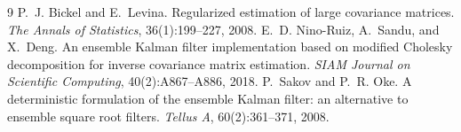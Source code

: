 \documentclass[11pt,a4paper]{article}
\begin{document}
\begin{thebibliography}{9}
 P.~J. Bickel and E.~Levina.
  Regularized estimation of large covariance matrices.
  \emph{The Annals of Statistics}, 36(1):199--227, 2008.
 E.~D. Nino-Ruiz, A.~Sandu, and X.~Deng.
  An ensemble Kalman filter implementation based on modified Cholesky
  decomposition for inverse covariance matrix estimation.
  \emph{SIAM Journal on Scientific Computing}, 40(2):A867--A886, 2018.
 P.~Sakov and P.~R. Oke.
  A deterministic formulation of the ensemble Kalman filter: an alternative to
  ensemble square root filters. \emph{Tellus A}, 60(2):361--371, 2008.
\end{thebibliography}
\end{document}
